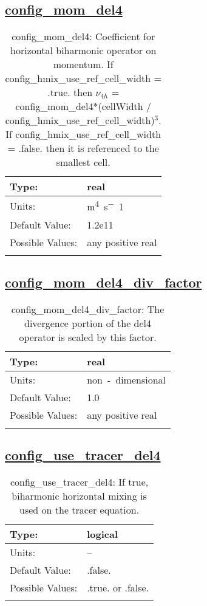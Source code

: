 \subsection[config\_mom\_del4]{\hyperref[sec:nm_tab_hmix_del4]{config\_mom\_del4}}
\label{subsec:nm_sec_config_mom_del4}
\begin{center}
\begin{longtable}{| p{2.0in} || p{4.0in} |}
    \hline
    Type: & real \\
    \hline
    Units: & \si{m^4.s^-1} \\
    \hline
    Default Value: & 1.2e11 \\
    \hline
    Possible Values: & any positive real \\
    \hline
    \caption{config\_mom\_del4: Coefficient for horizontal biharmonic operator on momentum.  If config\_hmix\_use\_ref\_cell\_width = .true. then $\nu_{4h}$ = config\_mom\_del4*(cellWidth / config\_hmix\_use\_ref\_cell\_width)$^3$. If config\_hmix\_use\_ref\_cell\_width = .false. then it is referenced to the smallest cell.}
\end{longtable}
\end{center}
\subsection[config\_mom\_del4\_div\_factor]{\hyperref[sec:nm_tab_hmix_del4]{config\_mom\_del4\_div\_factor}}
\label{subsec:nm_sec_config_mom_del4_div_factor}
\begin{center}
\begin{longtable}{| p{2.0in} || p{4.0in} |}
    \hline
    Type: & real \\
    \hline
    Units: & \si{non-dimensional} \\
    \hline
    Default Value: & 1.0 \\
    \hline
    Possible Values: & any positive real \\
    \hline
    \caption{config\_mom\_del4\_div\_factor: The divergence portion of the del4 operator is scaled by this factor.}
\end{longtable}
\end{center}
\subsection[config\_use\_tracer\_del4]{\hyperref[sec:nm_tab_hmix_del4]{config\_use\_tracer\_del4}}
\label{subsec:nm_sec_config_use_tracer_del4}
\begin{center}
\begin{longtable}{| p{2.0in} || p{4.0in} |}
    \hline
    Type: & logical \\
    \hline
    Units: & -- \\
    \hline
    Default Value: & .false. \\
    \hline
    Possible Values: & .true. or .false. \\
    \hline
    \caption{config\_use\_tracer\_del4: If true, biharmonic horizontal mixing is used on the tracer equation.}
\end{longtable}
\end{center}
